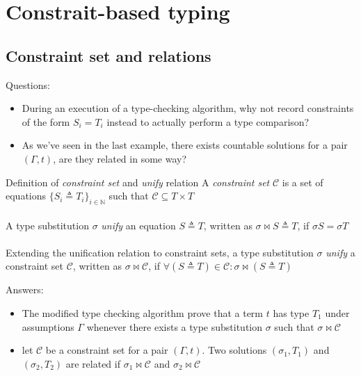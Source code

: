\documentclass[8pt]{beamer}
\begin{document}
\section{Constrait-based typing}
\subsection{Constraint set and relations}
\begin{frame}
    Questions:
    \begin{itemize}
        \item During an execution of a type-checking algorithm, why
                    not record constraints of the form $S_i = T_i$ instead 
                    to actually perform a type comparison?
        \item As we've seen in the last example, there exists countable 
                    solutions for a pair $(\Gamma, t)$, are they related in 
                    some way? 
    \end{itemize}
    \pause
    \begin{block}{Definition of \emph{constraint set} 
                    and \emph{unify} relation}
        A \emph{constraint set} $\mathcal{C}$ is a set of equations 
        $\{S_i \triangleq T_i \}_{i \in \mathbb{N}}$ such that 
        $\mathcal{C} \subseteq T \times T$
        \\~\\
        A type substitution $\sigma$ \emph{unify} an equation 
        $S \triangleq T$, written as $\sigma \Join S \triangleq T$, 
        if $\sigma S = \sigma T$
        \\~\\
        Extending the unification relation to constraint sets, a type substitution
        $\sigma$ \emph{unify} a constraint set $\mathcal{C}$, written as 
        $\sigma \Join \mathcal{C}$, if $\forall (S \triangleq T)
        \in \mathcal{C}: \sigma \Join (S \triangleq T)$ 
    \end{block}
    \pause
    Answers:
    \begin{itemize}
        \item The modified type checking algorithm prove that a 
            term $t$ has type $T_1$ under assumptions $\Gamma$ 
            whenever there exists a type substitution $\sigma$ such that 
            $\sigma \Join \mathcal{C}$
        \item let $\mathcal{C}$ be a constraint set for a pair $(\Gamma, t)$.
            Two solutions $(\sigma_1,T_1)$ and $(\sigma_2,T_2)$ are related if  
            $\sigma_1 \Join \mathcal{C}$ and $\sigma_2 \Join \mathcal{C}$ 
    \end{itemize}
\end{frame}
\end{document}
